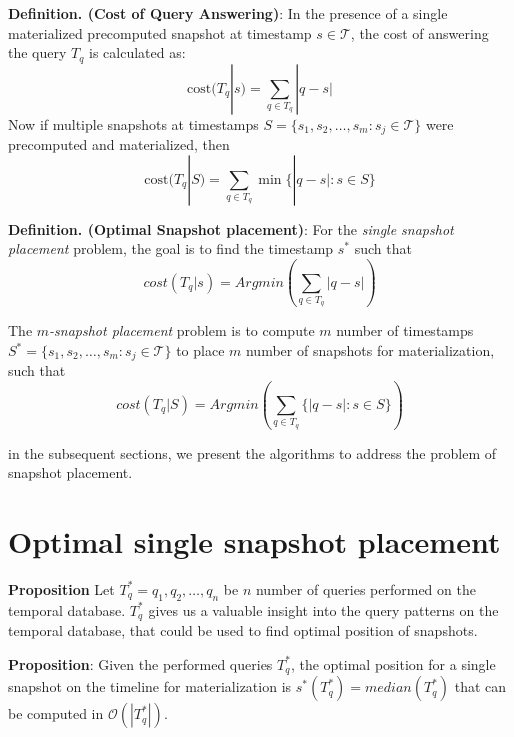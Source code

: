 \textbf{Definition. (Cost of Query Answering)}: In the presence of a single materialized precomputed snapshot at timestamp $s \in \mathcal{T}$, the cost of answering the query $T_q$ is calculated as:
$$\mathrm{cost}(T_q | s) = \sum_{q\in T_q} |q - s|$$
Now if multiple snapshots at timestamps $S=\{s_1, s_2, \dots, s_m : s_j \in \mathcal{T}\}$ were precomputed and materialized, then 
$$\mathrm{cost}(T_q|S) = \sum_{q\in T_q} \min\{|q-s| : s\in S\}$$

\textbf{Definition. (Optimal Snapshot placement)}: For the \emph{single snapshot placement} problem, the goal is to find the timestamp $s^*$ such that 
$$cost(T_q|s)= Arg min(\sum_{q\in T_q}|q - s|)$$

The \emph{$m$-snapshot placement} problem is to compute $m$ number of timestamps $S^*=\{s_1, s_2, \dots, s_m: s_j \in \mathcal{T}\}$ to place $m$ number of snapshots for materialization, such that 
$$cost(T_q|S)= Arg min(\sum_{q\in T_q}\{|q - s|:s \in S\})$$

in the subsequent sections, we present the algorithms to address the problem of snapshot placement.

\section{Optimal single snapshot placement}
\textbf{Proposition} Let $T_q^* = {q_1,q_2, \dots , q_n}$ be $n$ number of queries performed on the temporal database. $T_q^*$ gives us a valuable insight into the query patterns on the temporal database, that could be used to find optimal position of snapshots.

\textbf{Proposition}: Given the performed queries $T_q^*$, the optimal position for a single snapshot on the timeline for materialization is $s^*(T_q^*)=median(T_q^*)$ that can be computed in $\mathcal{O}(|T_q^*|)$.

